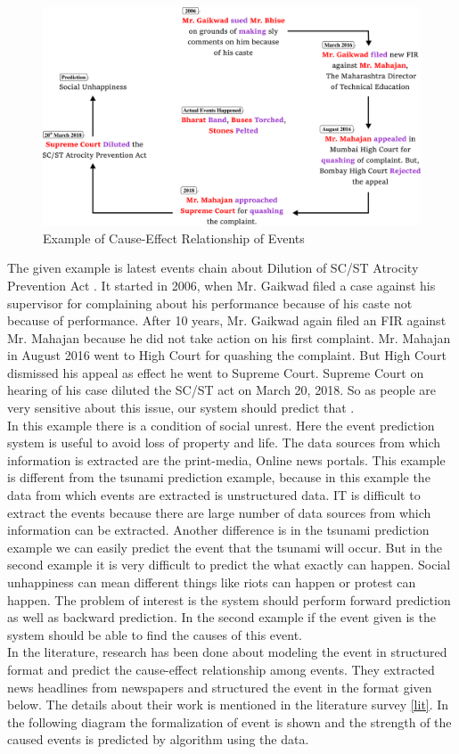 \documentclass[journal,onecolumn,11pt]{IEEEtran}
\begin{document}
\begin{figure}[h!]
    \centering    
    \includegraphics[scale=0.5]{new2_PNG.png}
    \caption{Example of Cause-Effect Relationship of Events}
\end{figure}
\newpage
The given example is latest events chain about Dilution of SC/ST Atrocity Prevention Act \cite{news}. It started in 2006, when Mr. Gaikwad filed a case against his supervisor for complaining about his performance because of his caste not because of performance. After 10 years, Mr. Gaikwad again filed an FIR against Mr. Mahajan because he did not take action on his first complaint.  Mr. Mahajan in August 2016 went to High Court for quashing the complaint. But High Court dismissed his appeal as effect he went to Supreme Court. Supreme Court on hearing of his case diluted the SC/ST act on March 20, 2018. So as people are very sensitive about this issue, our system should predict that . \\
\indent In this example there is a condition of social unrest. Here the event prediction system is useful to avoid loss of property and life. The data sources from which information is extracted are the print-media, Online news portals. This example is different from the tsunami prediction example, because in this example the data from which events are extracted is unstructured data. IT is difficult to extract the events because there are large number of data sources from which information can be extracted. Another difference is in the tsunami prediction example we can easily predict the event that the tsunami will occur. But in the second example it is very difficult to predict the what exactly can happen. Social unhappiness can mean different things like riots can happen or protest can happen. The problem of interest is the system should perform forward prediction as well as backward prediction. In the second example if the event given is  the system should be able to find the causes of this event.\\
\indent In the literature, research has been done about modeling the event in structured format and predict the cause-effect relationship among events. They extracted news headlines from newspapers and structured the event in the format given below. The details about their work is mentioned in the literature survey \autoref{lit}.
In the following diagram the formalization of event is shown and the strength of the caused events is predicted by algorithm using the data.
\end{document}
